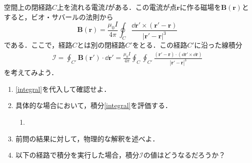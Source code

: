 \documentclass[a4paper,uplatex,dvipdfmx]{jsarticle}
\theoremstyle{definition}
\begin{document}
空間上の閉経路$C$上を流れる電流$I$がある．この電流が点$\bm{r}$に作る磁場を$\bm{B}(\bm{r})$とすると，ビオ・サバールの法則から
\begin{equation}
  \bm{B}(\bm{r})
  =
  \frac{\mu_{0}I}{4\pi}
  \oint_{C}
  \frac{\dd \bm{r}'\times(\bm{r}'-\bm{r})}{|\bm{r}'-\bm{r}|^3}
  \nonumber
\end{equation}
である．ここで，経路$C$とは別の閉経路$C'$をとる．この経路$C'$に沿った線積分
\begin{align}
  \mathcal{I}
  =
  \oint_{C'}\bm{B}(\bm{r}')\cdot\dd\bm{r}'
  =
  \frac{\mu_{0}I}{4\pi}
  \oint_{C}\oint_{C'}
  \frac{(\bm{r}'-\bm{r})\cdot(\dd\bm{r}'\times\dd\bm{r})}{|\bm{r}'-\bm{r}|^3}
  \tag{1}
  \label{integral}
\end{align}
を考えてみよう．

\begin{enumerate}
  \item 
  \eqref{integral}を代入して確認せよ．

  \item 
  具体的な場合において，積分\eqref{integral}を評価する．
  \begin{enumerate}
    \item 


  \end{enumerate}
  
  \item 
  前問の結果に対して，物理的な解釈を述べよ．

  \item 
  以下の経路で積分を実行した場合，積分$\mathcal{I}$の値はどうなるだろうか？

\end{enumerate}
\end{document}
